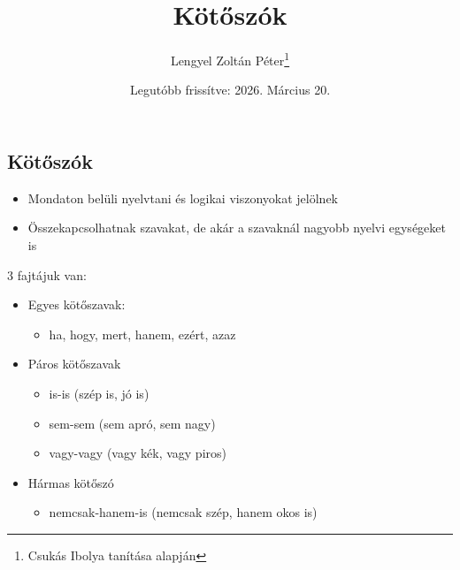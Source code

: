 \documentclass{article}
\title{Kötőszók}
\author{Lengyel Zoltán Péter\thanks{Csukás Ibolya tanítása alapján}}
\date{Legutóbb frissítve: 2026. Március 20.}
\begin{document}
\maketitle
\tableofcontents
\newpage

\begin{center}
    \section{Kötőszók}
\end{center}

\begin{itemize}
    \item Mondaton belüli nyelvtani és logikai viszonyokat jelölnek
    \item Összekapcsolhatnak szavakat, de akár a szavaknál nagyobb nyelvi egységeket is
\end{itemize}

3 fajtájuk van:
\begin{itemize}
    \item Egyes kötőszavak: \begin{itemize}
        \item ha, hogy, mert, hanem, ezért, azaz
    \end{itemize}
    \item Páros kötőszavak \begin{itemize}
        \item is-is (szép is, jó is)
        \item sem-sem (sem apró, sem nagy)
        \item vagy-vagy (vagy kék, vagy piros)
    \end{itemize}
    \item Hármas kötőszó \begin{itemize}
        \item nemcsak-hanem-is (nemcsak szép, hanem okos is)
    \end{itemize}
\end{itemize}
\end{document}
